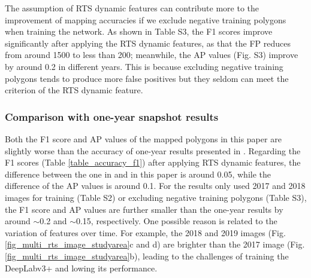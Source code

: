 \documentclass[authoryear,preprint,review,12pt]{elsarticle}
\begin{document}
The assumption of RTS dynamic features can contribute more to the improvement of mapping accuracies if we exclude negative training polygons when training the network. 
As shown in Table S3, the F1 scores improve significantly after applying the RTS dynamic features, as that the FP reduces from around 1500 to less than 200; meanwhile, the AP values (Fig. S3) improve by around 0.2 in different years. 
This is because excluding negative training polygons tends to produce more false positives but they seldom can meet the criterion of the RTS dynamic feature.  



\subsubsection{Comparison with one-year snapshot results}
\label{sec_compare_with_201805_results}

Both the F1 score and AP values of the mapped polygons in this paper are slightly worse than the accuracy of one-year results presented in \cite{huang2020using}. 
Regarding the F1 scores (Table \ref{table_accuracy_f1}) after applying RTS dynamic features, the difference between the one in \cite{huang2020using} and in this paper is around 0.05, while the difference of the AP values is around 0.1.
For the results only used 2017 and 2018 images for training (Table S2) or excluding negative training polygons (Table S3), the F1 score and AP values are further smaller than the one-year results by around $\sim$0.2 and $\sim$0.15, respectively. 
One possible reason is related to the variation of features over time. 
For example, the 2018 and 2019 images (Fig. \ref{fig_multi_rts_image_studyarea}c and d) are brighter than the 2017 image (Fig. \ref{fig_multi_rts_image_studyarea}b), leading to the challenges of training the DeepLabv3+ and lowing its performance. %

\end{document}
